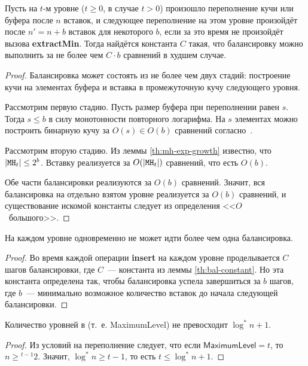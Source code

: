 \begin{lem} \label{th:bal-constant}
Пусть на $t$-м уровне ($t \geq 0$, в случае \CH[*] $t > 0$)
произошло переполнение кучи \MH[t] или буфера
после $n$ вставок, и следующее переполнение на этом уровне
произойдёт после $n' = n + b$ вставок для некоторого $b$,
если за это время не произойдёт вызова \textbf{extractMin}.
Тогда найдётся константа $C$ такая, что балансировку можно
выполнить за не более чем $C \cdot b$ сравнений в худшем случае.
\end{lem}
\begin{proof}
Балансировка может состоять из не более чем двух стадий:
построение кучи на элементах буфера и вставка в промежуточную
кучу следующего уровня.

Рассмотрим первую стадию. Пусть размер буфера при переполнении
равен $s$. Тогда $s \leq b$ в силу монотонности повторного логарифма.
На $s$ элементах можно построить бинарную кучу за $O(s) \in O(b)$ сравнений
согласно~\cite[с.~181]{Cormen}.

Рассмотрим вторую стадию. Из леммы \ref{th:mh-exp-growth}
известно, что $|\MH[t]| \leq 2^b$. Вставку реализуется
за $O(|\MH[t]|)$ сравнений, что есть $O(b)$.

Обе части балансировки реализуются за $O(b)$ сравнений. Значит,
вся балансировка на отдельно взятом уровне реализуется за $O(b)$
сравнений, и существование искомой константы следует из определения
<<$O$~большого>>.
\end{proof}

\begin{lem} \label{th:one-balancing}
На каждом уровне одновременно не может идти более чем одна балансировка.
\end{lem}
\begin{proof}
Во время каждой операции \textbf{insert} на каждом уровне проделывается
$C$ шагов балансировки, где $C$~--- константа из леммы \ref{th:bal-constant}.
Но эта константа определена так, чтобы балансировка успела завершиться
за $b$ шагов, где $b$~--- минимально возможное количество вставок
до начала следующей балансировки.
\end{proof}

\begin{lem} \label{th:log*-levels}
Количество уровней в \CH[*] (т.~е. \textsf{MaximumLevel}) не превосходит
$\log^* n + 1$.
\end{lem}
\begin{proof}
Из условий на переполнение следует, что если $\mathsf{MaximumLevel} = t$,
то $n \geq {}^{t-1}2$. Значит, $\log^* n \geq t-1$, то есть
$t \leq \log^* n + 1$.
\end{proof}


